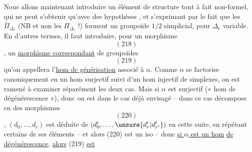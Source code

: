 Nous allons maintenant introduire
un élément de structure tout à fait
non-formel, qui ne peut s'obtenir
qu'avec des hypothèses 
, et s'exprimant
par le fait que les $\widetilde\Pi_{\Delta_r}$ (NB et
non les $\Pi_{\Delta_r}$ !) forment un groupoïde
$1/2$ simplicial, pour $\Delta_r$ variable. En d'autres
termes, il faut introduire, 
pour un morphisme
\[
(218)
\]
,
un \uline{morphisme correspondant} de groupoïdes
\[
(219)
\]
qu'on appellera l'\uline{hom de générisation}
associé à $\alpha$.
Comme $\alpha$ se factorise
canoniquement en un hom surjectif
suivi d'un hom injectif de simplexes,
on est ramené à examiner séparément
les deux cas. Mais si $\alpha$ est surjectif
(« hom de dégénérescence »), 
donc on est dans le cas déjà envisagé --
 dans ce cas
décompose en des morphismes
\[
(220)
\]
,
$(d_0,\ldots,d_r)$ est déduite de $(d'_0,\ldots,\unsure{d'_r|d'_{r'}})$
en  cette suite, en répétant certains
de ses éléments -- et  alors (220) est
un iso -- donc \uline{si $\alpha$ est un hom}
\uline{de dégénérescence}, \uline{alors} (219) \uline{est }
